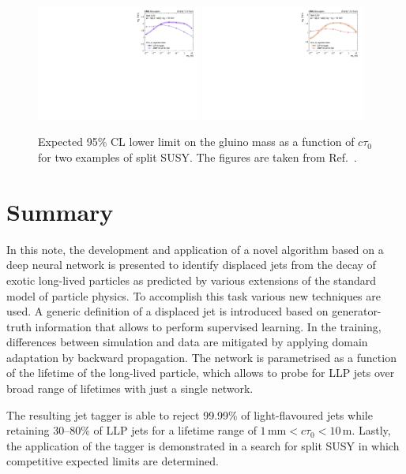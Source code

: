\documentclass{webofc}
\newcommand{\ctau}{\ensuremath{c\tau_{0}}\xspace}
\begin{document}
\begin{figure}[!ht]
\includegraphics[width=0.48\textwidth]{figs/summaryU.pdf}\hspace{0.03\textwidth}
\includegraphics[width=0.48\textwidth]{figs/summaryC.pdf}
\centering
\caption{\label{fig:limits}Expected 95\% CL lower limit on the gluino mass as a function of \ctau for two examples of split SUSY. The figures are taken from Ref.~\cite{CMS-EXO-19-011}.}
\label{fig-4}
\end{figure}

\section{Summary}
\label{Summary}

In this note, the development and application of a novel algorithm based on a deep neural network is presented to identify displaced jets from the decay of exotic long-lived particles as predicted by various extensions of the standard model of particle physics. To accomplish this task various new techniques are used. A generic definition of a displaced jet is introduced based on generator-truth information that allows to perform supervised learning. In the training, differences between simulation and data are mitigated by applying domain adaptation by backward propagation. The network is parametrised as a function of the lifetime of the long-lived particle, which allows to probe for LLP jets over broad range of lifetimes with just a single network. 

The resulting jet tagger is able to reject 99.99\% of light-flavoured jets while retaining 30--80\% of LLP jets for a lifetime range of $1\,\textrm{mm}<\ctau<10\,\textrm{m}$. Lastly, the application of the tagger is demonstrated in a search for split SUSY in which competitive expected limits are determined.
\end{document}
